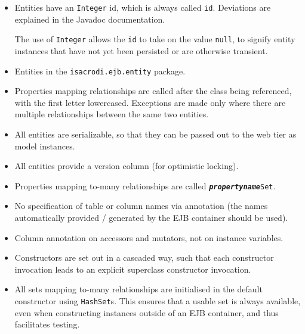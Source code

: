 \documentclass[a4paper,fleqn]{article}
\newcommand{\computercode}[1]{\texttt{#1}}
\newcommand{\computermeta}[1]{\texttt{\textbf{\textit{#1}}}}
\begin{document}
\begin{itemize}

\item Entities have an \computercode{Integer} id, which is always
  called \computercode{id}. Deviations are explained in the Javadoc
  documentation.

  The use of \computercode{Integer} allows
  the \computercode{id} to take on the value \computercode{null}, to
  signify entity instances that have not yet been persisted or are
  otherwise transient.

\item Entities in the \computercode{isacrodi.ejb.entity} package.

\item Properties mapping relationships are called after the class
  being referenced, with the first letter lowercased. Exceptions are
  made only where there are multiple relationships between the same
  two entities.

\item All entities are serializable, so that they can be passed out to the
  web tier as model instances.

\item All entities provide a version column (for optimistic locking).

\item Properties mapping to-many relationships are called
  \computercode{\computermeta{propertyname}Set}.

\item No specification of table or column names via annotation (the
  names automatically provided / generated by the EJB container should
  be used).

\item Column annotation on accessors and mutators, not on instance
  variables.

\item Constructors are set out in a cascaded way, such that each
  constructor invocation leads to an explicit superclass constructor
  invocation.

\item All sets mapping to-many relationships are initialised in the
  default constructor using \computercode{HashSet}s. This ensures that
  a usable set is always available, even when constructing instances
  outside of an EJB container, and thus facilitates testing.

\end{itemize}
\end{document}
